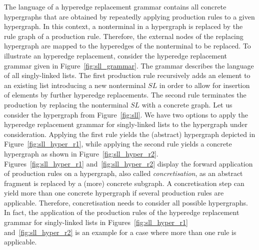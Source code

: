 \documentclass[a4paper, 12pt, twoside]{report}
\begin{document}
	The language of a hyperedge replacement grammar contains all concrete hypergraphs that are obtained by repeatedly applying production rules to a given hypergraph. In this context, a nonterminal in a hypergraph is replaced by the rule graph of a production rule. Therefore, the external nodes of the replacing hypergraph are mapped to the hyperedges of the nonterminal to be replaced. To illustrate an hyperedge replacement, consider the hyperedge replacement grammar given in Figure~\ref{fig:sll_grammar}. The grammar describes the language of all singly-linked lists. The first production rule recursively adds an element to an existing list introducing a new nonterminal $SL$ in order to allow for insertion of elements by further hyperedge replacements. The second rule terminates the production by replacing the nonterminal $SL$ with a concrete graph. Let us consider the hypergraph from Figure~\ref{fig:sll}. We have two options to apply the hyperedge replacement grammar for singly-linked lists to the hypergraph under consideration. Applying the first rule yields the (abstract) hypergraph depicted in Figure~\ref{fig:sll_hyper_r1}, while applying the second rule yields a concrete hypergraph as shown in Figure~\ref{fig:sll_hyper_r2}.\\	
	
	Figures~\ref{fig:sll_hyper_r1} and~\ref{fig:sll_hyper_r2} display the forward application of production rules on a hypergraph, also called \textit{concretisation}, as an abstract fragment is replaced by a (more) concrete subgraph. A concretisation step can yield more than one concrete hypergraph if several production rules are applicable. Therefore, concretisation needs to consider all possible hypergraphs. In fact, the application of the production rules of the hyperedge replacement grammar for singly-linked lists in Figures~\ref{fig:sll_hyper_r1} and~\ref{fig:sll_hyper_r2} is an example for a case where more than one rule is applicable.\\	
	
\end{document}
